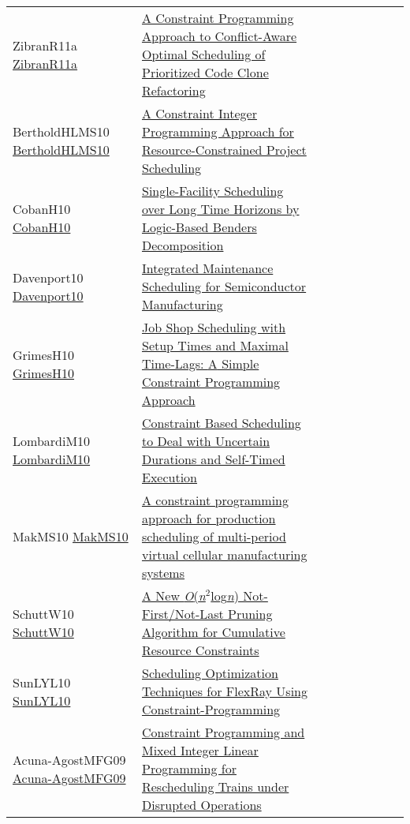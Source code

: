 {\begin{longtable}{p{3cm}p{7cm}lllllll}
ZibranR11a \href{https://doi.org/10.1109/SCAM.2011.21}{ZibranR11a} &  \href{papers/ZibranR11a.pdf}{A Constraint Programming Approach to Conflict-Aware Optimal Scheduling of Prioritized Code Clone Refactoring} &  &  &  &  &  &  & \\
BertholdHLMS10 \href{https://doi.org/10.1007/978-3-642-13520-0\_34}{BertholdHLMS10} &  \href{papers/BertholdHLMS10.pdf}{A Constraint Integer Programming Approach for Resource-Constrained Project Scheduling} &  &  &  &  &  &  & \\
CobanH10 \href{https://doi.org/10.1007/978-3-642-13520-0\_11}{CobanH10} &  \href{papers/CobanH10.pdf}{Single-Facility Scheduling over Long Time Horizons by Logic-Based Benders Decomposition} &  &  &  &  &  &  & \\
Davenport10 \href{https://doi.org/10.1007/978-3-642-13520-0\_12}{Davenport10} &  \href{papers/Davenport10.pdf}{Integrated Maintenance Scheduling for Semiconductor Manufacturing} &  &  &  &  &  &  & \\
GrimesH10 \href{https://doi.org/10.1007/978-3-642-13520-0\_19}{GrimesH10} &  \href{papers/GrimesH10.pdf}{Job Shop Scheduling with Setup Times and Maximal Time-Lags: {A} Simple Constraint Programming Approach} &  &  &  &  &  &  & \\
LombardiM10 \href{https://doi.org/10.1007/978-3-642-15396-9\_32}{LombardiM10} &  \href{papers/LombardiM10.pdf}{Constraint Based Scheduling to Deal with Uncertain Durations and Self-Timed Execution} &  &  &  &  &  &  & \\
MakMS10 \href{https://doi.org/10.1109/ICNC.2010.5583494}{MakMS10} &  \href{papers/MakMS10.pdf}{A constraint programming approach for production scheduling of multi-period virtual cellular manufacturing systems} &  &  &  &  &  &  & \\
SchuttW10 \href{https://doi.org/10.1007/978-3-642-15396-9\_36}{SchuttW10} &  \href{papers/SchuttW10.pdf}{A New \emph{O}(\emph{n}\({}^{\mbox{2}}\)log\emph{n}) Not-First/Not-Last Pruning Algorithm for Cumulative Resource Constraints} &  &  &  &  &  &  & \\
SunLYL10 \href{https://doi.org/10.1109/GreenCom-CPSCom.2010.111}{SunLYL10} &  \href{papers/SunLYL10.pdf}{Scheduling Optimization Techniques for FlexRay Using Constraint-Programming} &  &  &  &  &  &  & \\
Acuna-AgostMFG09 \href{https://doi.org/10.1007/978-3-642-01929-6\_24}{Acuna-AgostMFG09} &  \href{papers/Acuna-AgostMFG09.pdf}{Constraint Programming and Mixed Integer Linear Programming for Rescheduling Trains under Disrupted Operations} &  &  &  &  &  &  & \\

\end{longtable}}
